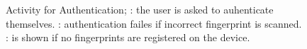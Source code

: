 \begin{figure}[H]
\centering
{}
\qquad
{}
\qquad
{}
\caption[Activity for Authentication]{Activity for Authentication; \protect{}: the user is asked to auhenticate themselves. \protect{}: authentication failes if incorrect fingerprint is scanned. \protect{}: is shown if no fingerprints are registered on the device.}
\label{fig:authentication}
\end{figure}

